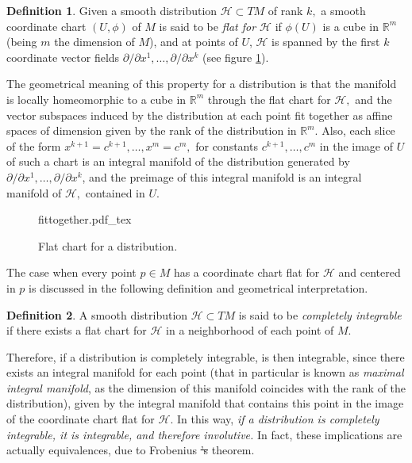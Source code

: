 \documentclass[12pt, letterpaper, reqno]{amsart}
\newcommand{\incfig}[2][1]{%
    \def\svgwidth{#1\columnwidth}
    {#2.pdf_tex}
}
\theoremstyle{definition}
\newtheorem{df}{Definition}
\theoremstyle{plain}
\theoremstyle{remark}
\providecommand{\DIFdel}[1]{{\protect\color{red}\sout{#1}}}                      %
\providecommand{\DIFdelbegin}{} %
\providecommand{\DIFdelend}{} %
\newcommand{\DIFscaledelfig}{0.5}
\newlength{\DIFdelgraphicswidth} %
\newlength{\DIFdelgraphicsheight} %
\newcommand{\DIFdelincludegraphics}[2][]{%
\sbox{\DIFdelgraphicsbox}{\DIFOincludegraphics[#1]{#2}}%
\settoboxwidth{\DIFdelgraphicswidth}{\DIFdelgraphicsbox} %
\settoboxtotalheight{\DIFdelgraphicsheight}{\DIFdelgraphicsbox} %
\scalebox{\DIFscaledelfig}{%
\parbox[b]{\DIFdelgraphicswidth}{\usebox{\DIFdelgraphicsbox}\\[-\baselineskip] \rule{\DIFdelgraphicswidth}{0em}}\llap{\resizebox{\DIFdelgraphicswidth}{\DIFdelgraphicsheight}{%
\setlength{\unitlength}{\DIFdelgraphicswidth}%
\begin{picture}(1,1)%
\thicklines\linethickness{2pt} %
{\color[rgb]{1,0,0}\put(0,0){\framebox(1,1){}}}%
{\color[rgb]{1,0,0}\put(0,0){\line( 1,1){1}}}%
{\color[rgb]{1,0,0}\put(0,1){\line(1,-1){1}}}%
\end{picture}%
}\hspace*{3pt}}} %
} %
\DeclareRobustCommand{\DIFdelbegin}{\DIFOdelbegin \let\includegraphics\DIFdelincludegraphics} %
\DeclareRobustCommand{\DIFdelend}{\DIFOaddend \let\includegraphics\DIFOincludegraphics} %
\begin{document}
\begin{df}
	Given a smooth distribution $ \mathcal{H}\subset TM $  of rank $ k, $ a smooth coordinate chart $ (U,\phi) $ of $ M $ is said to be \textit{flat for $ \mathcal{H} $ } if $ \phi(U) $ is a cube in $ \mathbb{R}^m  $ (being $ m $ the dimension of $ M $), and at points of $ U $, $ \mathcal{H} $ is spanned by the first $ k $ coordinate vector fields $ \partial/\partial x^1,\dots,\partial/\partial x^k $ (see figure \ref{fig:fittogether}).
\end{df}
The geometrical meaning of this property for a distribution is that the manifold is locally homeomorphic to a cube in $ \mathbb{R}^m  $ through the flat chart for $ \mathcal{H}, $  and the vector subspaces induced by the distribution at each point fit together as affine spaces of dimension given by the rank of the distribution in $ \mathbb{R}^m $. Also, each slice of the form $ x^{k+1}=c^{k+1},\dots, x^m=c^m,$ for constants $ c^{k+1}, \dots, c^m $ in the image of $ U $ of such a chart is an integral manifold of the distribution generated by $ \partial/\partial x^1,\dots,\partial/\partial x^k $, and the preimage of this integral manifold is an integral manifold of $ \mathcal{H}, $ contained in $ U. $  

\begin{figure}
    \centering
    \incfig{fittogether}
    \caption{Flat chart for a distribution.}
    \label{fig:fittogether}
\end{figure}

The case when every point $p\in M $ has a coordinate chart flat for $ \mathcal{H} $ and centered in $ p $ is discussed in the following definition and geometrical interpretation.

\begin{df}
	A smooth distribution $ \mathcal{H}\subset TM $  is said to be \textit{completely integrable} if there exists a flat chart for $ \mathcal{H} $ in a neighborhood of each point of $ M. $ 
\end{df}

Therefore, if a distribution is completely integrable, is then integrable, since there exists an integral manifold for each point (that in particular is known as \textit{maximal integral manifold}, as the dimension of this manifold coincides with the rank of the distribution), given by the integral manifold that contains this point in the image of the coordinate chart flat for $ \mathcal{H}. $ In this way, \textit{ if a distribution is completely integrable, it is integrable, and therefore involutive.} In fact, these implications are actually equivalences, due to Frobenius \DIFdelbegin \DIFdel{'s }\DIFdelend theorem.
\end{document}
